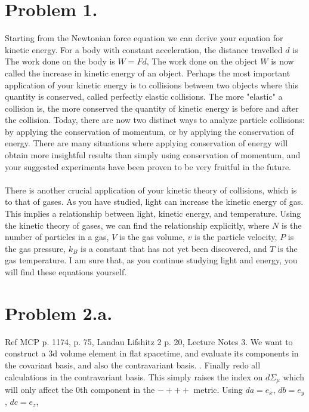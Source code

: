\documentclass{article}
\begin{document}
\section*{Problem 1.}
Starting from the Newtonian force equation we can derive your equation for kinetic energy.
For a body with constant acceleration, the distance travelled $d$ is
The work done on the body is $W=Fd$, 
The work done on the object $W$ is now called the increase in kinetic energy of an object. Perhaps the most important application of your kinetic energy is to collisions between two objects where this quantity is conserved, called perfectly elastic collisions. The more "elastic" a collision is, the more conserved the quantity of kinetic energy is before and after the collision. Today, there are now two distinct ways to analyze particle collisions: by applying the conservation of momentum, or by applying the conservation of energy. There are many situations where applying conservation of energy will obtain more insightful results than simply using conservation of momentum, and your suggested experiments have been proven to be very fruitful in the future.\\~\\
There is another crucial application of your kinetic theory of collisions, which is to that of gases. As you have studied, light can increase the kinetic energy of gas. This implies a relationship between light, kinetic energy, and temperature. Using the kinetic theory of gases, we can find the relationship explicitly,
where $N$ is the number of particles in a gas, $V$ is the gas volume, $v$ is the particle velocity, $P$ is the gas pressure, $k_B$ is a constant that has not yet been discovered, and $T$ is the gas temperature. I am sure that, as you continue studying light and energy, you will find these equations yourself.
\section*{Problem 2.a.}
Ref MCP p. 1174, p. 75, Landau Lifshitz 2 p. 20, Lecture Notes 3. We want to construct a 3d volume element in flat spacetime, and evaluate its components in the covariant basis, and also the contravariant basis.
. Finally redo all calculations in the contravariant basis. This simply raises the index on $d\Sigma_\mu$ which will only affect the 0th component in the $-+++$ metric. Using $da=e_x$, $db=e_y$, $dc=e_z$,
\end{document}
